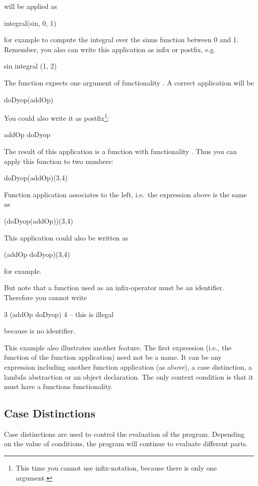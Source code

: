  will be applied as
\begin{prog}
        integral(sin, 0, 1)
\end{prog}
 for example to compute  the integral over the sinus function between 0 and
1.
Remember, you also can write this application as infix or postfix, e.g.
\begin{prog}
        sin integral (1, 2)
\end{prog}

The function  expects one argument of functionality
. A correct application will be 
\begin{prog}
        doDyop(addOp)
\end{prog}
You could also write it as postfix\footnote{This time you cannot use
  infix-notation, because there is only one argument.}:
\begin{prog}
        addOp doDyop
\end{prog}

The result of this application is a function with functionality
.
Thus you can apply this function to two numbers:
\begin{prog}
        doDyop(addOp)(3,4)
\end{prog}
Function application associates to the left, i.e.~the expression
above is the same as 
\begin{prog}
        (doDyop(addOp))(3,4)
\end{prog}

This application could also be written as
\begin{prog}
        (addOp doDyop)(3,4)
\end{prog}
for example.

But note that a function used as an infix-operator
must be an identifier. 
Therefore you cannot write
\begin{prog}
        3 (addOp doDyop) 4     -- this is illegal
\end{prog}
because   is no identifier.

\medskip

This example also illustrates another feature. 
The first expression (i.e., the function of the function application)
need not be a name. 
It can be any expression including another function
application (as above), a case distinction, a lambda abstraction or an
object declaration.
The only context condition is that it must have a functions
functionality.

\subsection{Case Distinctions}
\label{subsec:cases}
\novice Case distinctions are used to control the evaluation of the program.
Depending on the value of conditions, the program will continue to
evaluate different parts.

